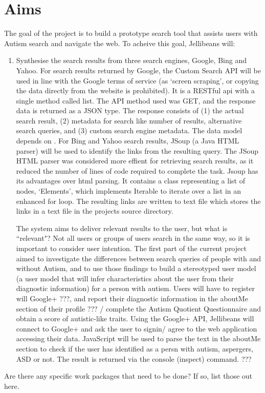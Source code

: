 \documentclass[a4paper, 11pt]{article}
\begin{document}
\section {Aims}
The goal of the project is to build a prototype search tool that assists users with Autism search and navigate the web. To acheive this goal, Jellibeans will:
\begin{enumerate}
\item{Synthesise the search results from three search engines, Google, Bing and Yahoo. For search results returned by Google, the Custom Search API will be used in line with the Google terms of service (as `screen scraping', or copying the data directly from the website is prohibited). It is a RESTful api with a single method called list. The API method used was GET, and the response data is returned as a JSON type. The response consists of (1) the actual search result, (2) metadata for search like number of  results, alternative search queries, and (3) custom search engine metadata. The data model depends on \cite{opensearch}.
For Bing and Yahoo search results, JSoup (a Java HTML parser) will be used to identify the links from the resulting query. The JSoup HTML parser was considered more effient for retrieving search results, as it reduced the number of lines of code required to complete the task. 
Jsoup has its advantages over html parsing. It contains a class representing a list of nodes, `Elements', which implements Iterable to iterate over a list in an enhanced for loop.
The resulting links are written to text file which stores the links in a text file in the projects source directory.
}

The system aims to deliver relevant results to the user, but what is ``relevant"? Not all users or groups of users search in the same way, so it is important to consider user intention. The first part of the current project aimed to investigate the differences between search queries of people with and without Autism, and to use those findings to build a stereotyped user model (a user model that will infer characteristics about the user from their diagnostic information) for a person with autism. Users will have to register will Google+ ???, and report their diagnostic information in the aboutMe section of their profile ??? / complete the Autism Quotient Questionnaire and obtain a score of autistic-like traits. Using the Google+ API, Jellibeans will connect to Google+ and ask the user to signin/ agree to the web application accessing their data. JavaScript will be used to parse the text in the aboutMe section to check if the user has identified as a persn with autism, aspergers, ASD or not. The result is returned via the console (inspect) command. ??? 

\end{enumerate}
Are there any specific work packages that need to be done? If so, list those out here.
\end{document}
